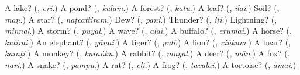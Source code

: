 \begin{tcolorbox}[breakable,colback=teal!4,colframe=teal!35!black,title={Before you move on}]
A lake? (\textbf{}, \emph{ēri}.) A pond? (\textbf{}, \emph{kuḷam}.) A forest? (\textbf{}, \emph{kāṭu}.) A leaf? (\textbf{}, \emph{ilai}.) Soil? (\textbf{}, \emph{maṇ}.) A star? (\textbf{}, \emph{naṭcattiram}.) Dew? (\textbf{}, \emph{paṉi}.) Thunder? (\textbf{}, \emph{iṭi}.) Lightning? (\textbf{}, \emph{miṉṉal}.) A storm? (\textbf{}, \emph{puyal}.) A wave? (\textbf{}, \emph{alai}.) A buffalo? (\textbf{}, \emph{erumai}.) A horse? (\textbf{}, \emph{kutirai}.) An elephant? (\textbf{}, \emph{yāṉai}.) A tiger? (\textbf{}, \emph{puli}.) A lion? (\textbf{}, \emph{ciṅkam}.) A bear? (\textbf{}, \emph{karaṭi}.) A monkey? (\textbf{}, \emph{kuraṅku}.) A rabbit? (\textbf{}, \emph{muyal}.) A deer? (\textbf{}, \emph{māṉ}.) A fox? (\textbf{}, \emph{nari}.) A snake? (\textbf{}, \emph{pāmpu}.) A rat? (\textbf{}, \emph{eli}.) A frog? (\textbf{}, \emph{tavaḷai}.) A tortoise? (\textbf{}, \emph{āmai}.)
\end{tcolorbox}
